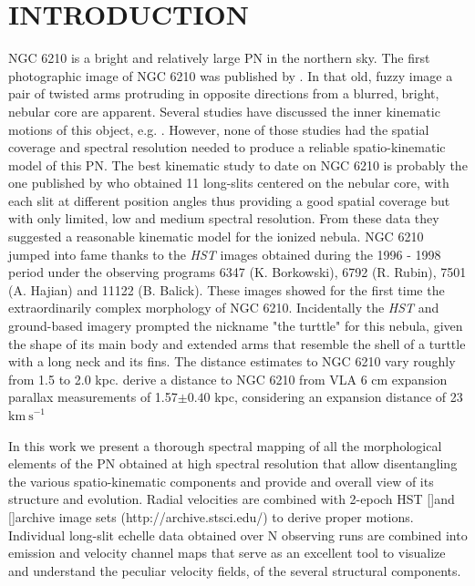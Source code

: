 \documentclass{aa}
\newcommand{\kms}{\ensuremath{\mathrm{km\ s}^{-1}}}
\newcommand{\nii}{[\ion{N}{2}]}
\newcommand{\oiii}{[\ion{O}{3}]}
\begin{document}
\section{INTRODUCTION}
\label{sec:introduction}
NGC 6210 is a bright and relatively large PN in the northern sky. The first photographic image of NGC 6210 was published by \citet{Duncan37}. In that old, fuzzy image a pair of twisted arms protruding in opposite directions from a blurred,  bright, nebular core are apparent. Several studies have discussed the inner kinematic motions of this object, e.g. \citet{Osterbrock66, Weedman68, Becker84, Icke89}. However, none of those studies had the spatial coverage and spectral resolution needed to produce a reliable spatio-kinematic model of this PN. 
The best kinematic study to date on NGC 6210 is probably the one published by \citet{Phillips96}  who obtained 11 long-slits centered on the nebular core, with each slit at different position angles thus providing a good spatial coverage but with only limited, low and medium spectral resolution. From these data  they suggested a  reasonable kinematic model for the ionized nebula. NGC 6210 jumped into fame thanks to the {\it HST} images obtained during the 1996 - 1998 period under the observing programs 6347 (K. Borkowski), 6792 (R. Rubin), 7501 (A. Hajian)  and 11122 (B. Balick). These images showed for the first time the extraordinarily complex morphology of NGC 6210. Incidentally the  {\it HST} and ground-based imagery prompted the nickname "the turttle" for this nebula, given the shape of its main body and extended arms that resemble the shell of a turttle with a long neck and its fins. The distance estimates to NGC 6210 vary roughly from 1.5 to 2.0 kpc. \citep{Hajian95} derive a distance to NGC 6210 from VLA 6 cm  expansion parallax measurements of 1.57$\pm0.40$ kpc, considering an expansion distance of 23 \kms 

In this work we present a thorough spectral mapping of all the morphological elements of the PN obtained at high spectral resolution that allow 
disentangling the various spatio-kinematic components and provide and overall view of its structure and evolution. Radial velocities are combined with 2-epoch HST \oiii and \nii archive image sets (http://archive.stsci.edu/) to derive proper motions. Individual long-slit echelle data obtained over N observing runs are combined into emission and velocity channel maps that serve as an excellent tool to visualize and understand the peculiar velocity fields, of the several structural components.
\end{document}
